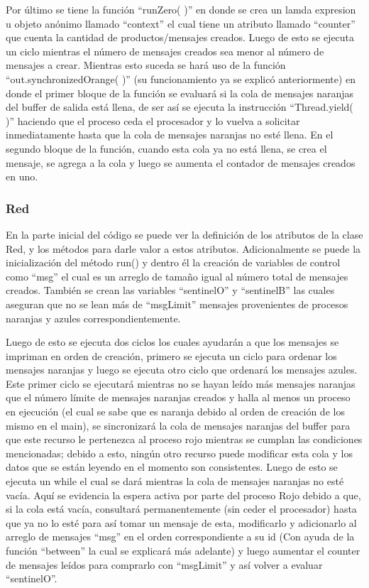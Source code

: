 \documentclass[a4paper]{article}
\begin{document}
        Por último se tiene la función “runZero( )” en donde se crea un lamda expresion u objeto anónimo llamado “context” el cual tiene un atributo llamado “counter” que cuenta la cantidad de productos/mensajes creados. Luego de esto se ejecuta un ciclo mientras el número de mensajes creados sea menor al número de mensajes a crear. Mientras esto suceda se hará uso de la función “out.synchronizedOrange( )” (su funcionamiento ya se explicó anteriormente) en donde el primer bloque de la función se evaluará si la cola de mensajes naranjas del buffer de salida está llena, de ser así se ejecuta la instrucción “Thread.yield( )” haciendo que el proceso ceda el procesador y lo vuelva a solicitar inmediatamente hasta que la cola de mensajes naranjas no esté llena. En el segundo bloque de la función, cuando esta cola ya no está llena, se crea el mensaje, se agrega a la cola y  luego se aumenta el contador de mensajes creados en uno. 

        \subsubsection{Red}


        En la parte inicial del código se puede ver la definición de los atributos de la clase Red, y los métodos para darle valor a estos atributos. Adicionalmente se puede la inicialización del método run() y dentro él la creación de variables de control como “msg” el cual es un arreglo de tamaño igual al número total de mensajes creados. También se crean las variables “sentinelO” y “sentinelB” las cuales aseguran que no se lean más de “msgLimit” mensajes provenientes de procesos naranjas y azules correspondientemente. 

        Luego de esto se ejecuta dos ciclos los cuales ayudarán a que los mensajes se impriman en orden de creación, primero se ejecuta un ciclo para ordenar los mensajes naranjas y luego se ejecuta otro ciclo que ordenará los mensajes azules. Este primer ciclo se ejecutará mientras no se hayan leído más mensajes naranjas que el número límite de mensajes naranjas creados y halla al menos un proceso en ejecución (el cual se sabe que es naranja debido al orden de creación de los mismo en el main), se sincronizará la cola de mensajes naranjas del buffer para que este recurso le pertenezca al proceso rojo mientras se cumplan las condiciones mencionadas; debido a esto, ningún otro recurso puede modificar  esta cola y los datos que se están leyendo en el momento son consistentes. Luego de esto se ejecuta un while el cual se dará mientras la cola de mensajes naranjas no esté vacía. Aquí se evidencia la espera activa por parte del proceso Rojo debido a que, si la cola está vacía, consultará permanentemente (sin ceder el procesador) hasta que ya no lo esté para así tomar un mensaje de esta,  modificarlo y adicionarlo al arreglo de mensajes “msg” en el orden correspondiente a su id (Con ayuda de la función “between” la cual se explicará más adelante) y luego aumentar el counter de mensajes leídos para comprarlo con “msgLimit” y así volver a evaluar “sentinelO”. 
\end{document}
